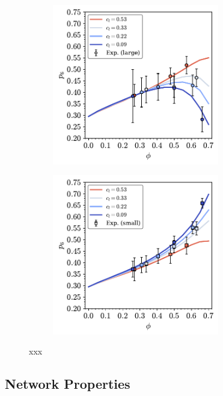\begin{figure}[bt]
      \begin{subfigure}[b]{0.45\textwidth}
         \centering
         \includegraphics[height=7cm]{./figures/quasi2d/bi_ssr_l_phi_p6.pdf}
         \caption{}
         \label{fig:bi3}
     \end{subfigure}
     \hfill
     \begin{subfigure}[b]{0.45\textwidth}
         \centering
         \includegraphics[height=7cm]{./figures/quasi2d/bi_ssr_s_phi_p6.pdf}
         \caption{}
         \label{fig:bi3}
     \end{subfigure}
     \hfill
    
     \caption{xxx}
     \label{fig:mono}
\end{figure}

\subsection{Network Properties}


